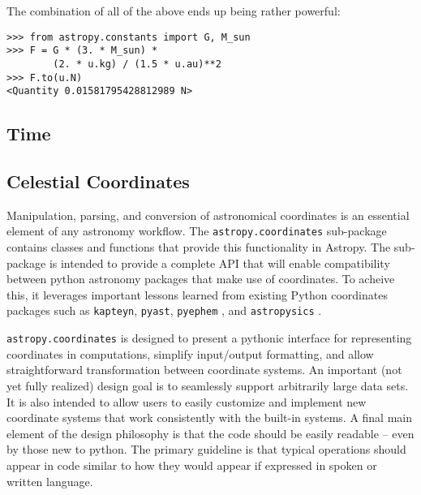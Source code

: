 \documentclass[traditabstract]{aa}
\begin{document}
The combination of all of the above ends up being rather powerful:
\begin{verbatim}
>>> from astropy.constants import G, M_sun
>>> F = G * (3. * M_sun) *
        (2. * u.kg) / (1.5 * u.au)**2
>>> F.to(u.N)
<Quantity 0.01581795428812989 N>
\end{verbatim}

\subsection{Time}



\subsection{Celestial Coordinates}



Manipulation, parsing, and conversion of astronomical coordinates is
an essential element of any astronomy workflow. The
\texttt{astropy.coordinates} sub-package contains classes and
functions that provide this functionality in Astropy. The sub-package
is intended to provide a complete API that will enable compatibility
between python astronomy packages that make use of coordinates.  To
acheive this, it leverages important lessons learned from existing
Python coordinates packages such as \texttt{kapteyn}, \texttt{pyast},
\texttt{pyephem} \citep{pyephem}, and \texttt{astropysics}
\citep{astropysics}.

\texttt{astropy.coordinates} is designed to present a pythonic
interface for representing coordinates in computations, simplify
input/output formatting, and allow straightforward transformation
between coordinate systems.  An important (not yet fully realized)
design goal is to seamlessly support arbitrarily large data sets.  It
is also intended to allow users to easily customize and implement new
coordinate systems that work consistently with the built-in systems.
A final main element of the design philosophy is that the code should
be easily readable -- even by those new to python.  The primary
guideline is that typical operations should appear in code similar to
how they would appear if expressed in spoken or written language.
\end{document}
